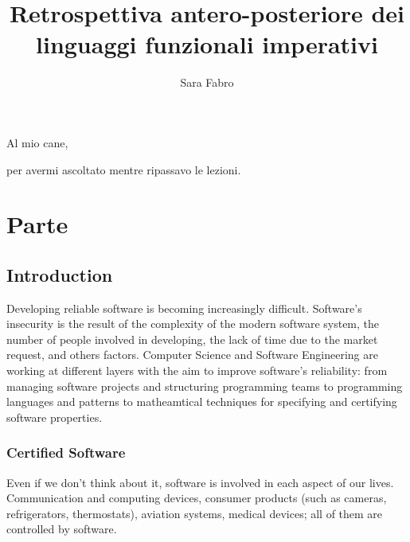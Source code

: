 \documentclass[target=mst,babel=\babelopt]{thud}[2014/01/17]
\title{Retrospettiva antero-posteriore dei linguaggi funzionali imperativi}
\author{Sara Fabro}
\begin{document}
\maketitle

\begin{dedication}Al mio cane,\par per avermi ascoltato mentre
  ripassavo le lezioni.\end{dedication}

\acknowledgements 

\abstract

\tableofcontents



\mainmatter

\part{Parte}

\chapter{Introduction}
Developing reliable software is becoming increasingly
difficult. Software's insecurity is the result of the complexity of the modern software system, the number of
people involved in developing, the lack of time due to the market
request, and others factors. Computer Science and Software Engineering
are working at different layers with the aim to improve software's
reliability: from managing software projects and
structuring programming teams to programming languages and patterns to
matheamtical techniques for specifying and certifying software properties.


\section{Certified Software}

Even if we don't think about it, software is involved in each aspect
of our lives. Communication and computing devices, consumer products (such as cameras,
refrigerators, thermostats), aviation systems, medical devices; all of them are controlled by software. 
\end{document}
